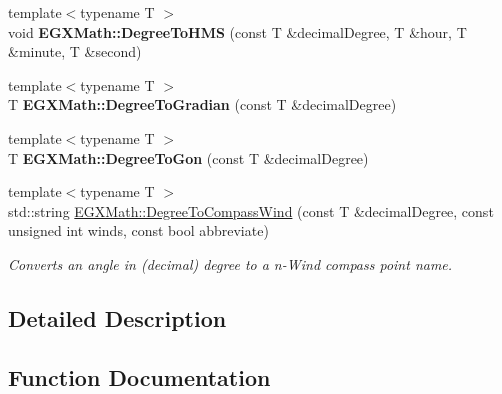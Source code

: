 \begin{DoxyCompactItemize}
\item 
\mbox{\label{group___e_g_x_math-_angle_conversions-_degree_ga0bb223ca6e77b00439a6d910ab32d82e}} 
{\footnotesize template$<$typename T $>$ }\\void {\bfseries E\+G\+X\+Math\+::\+Degree\+To\+H\+MS} (const T \&decimal\+Degree, T \&hour, T \&minute, T \&second)
\item 
\mbox{\label{group___e_g_x_math-_angle_conversions-_degree_ga25bb5506b3f66fff7a1b85bf7bd795b3}} 
{\footnotesize template$<$typename T $>$ }\\T {\bfseries E\+G\+X\+Math\+::\+Degree\+To\+Gradian} (const T \&decimal\+Degree)
\item 
\mbox{\label{group___e_g_x_math-_angle_conversions-_degree_ga87c3fab0867021e5d2501197b4db6194}} 
{\footnotesize template$<$typename T $>$ }\\T {\bfseries E\+G\+X\+Math\+::\+Degree\+To\+Gon} (const T \&decimal\+Degree)
\item 
{\footnotesize template$<$typename T $>$ }\\std\+::string \mbox{\hyperlink{group___e_g_x_math-_angle_conversions-_degree_ga5ffef873bcec300ab90570ad6e7b1ab1}{E\+G\+X\+Math\+::\+Degree\+To\+Compass\+Wind}} (const T \&decimal\+Degree, const unsigned int winds, const bool abbreviate)
\begin{DoxyCompactList}\small\item\em Converts an angle in (decimal) degree to a n-\/\+Wind compass point name. \end{DoxyCompactList}\end{DoxyCompactItemize}


\subsection{Detailed Description}


\subsection{Function Documentation}
\mbox{\label{group___e_g_x_math-_angle_conversions-_degree_gac1b5f3b68f66c77a6df4ceef842c9b19}} 
